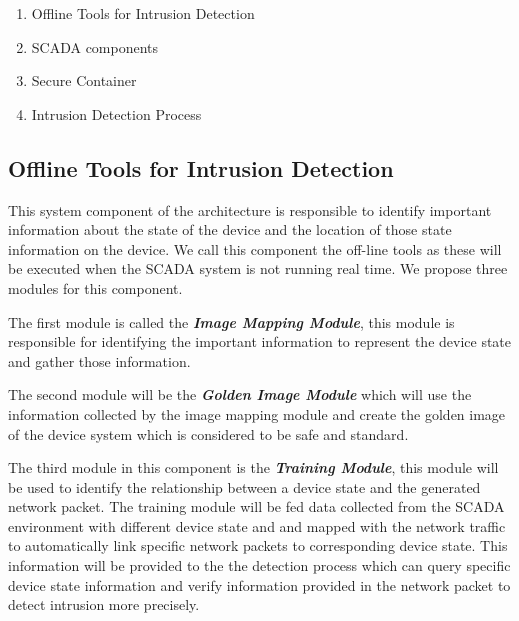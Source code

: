 \documentclass[conference]{IEEEtran}
\begin{document}
\begin{enumerate}[label=(\alph*)]
\item Offline Tools for Intrusion Detection
\item SCADA components
\item Secure Container
\item Intrusion Detection Process
\end{enumerate}
\subsection{Offline Tools for Intrusion Detection}
This system component of the architecture is responsible to identify important information about the state of the device and the location of those state information on the device. We call this component the off-line tools as these will be executed when the SCADA system is not running real time. We propose three modules for this component. 
\par The first module is called the \textit{\textbf{Image Mapping Module}}, this module is responsible for identifying the important information to represent the device state and gather those information.
\par The second module will be the \textit{\textbf{Golden Image Module}} which will use the information collected by the image mapping module and create the golden image of the device system which is considered to be safe and standard. \par The third module in this component is the \textit{\textbf{Training Module}}, this module will be used to identify the relationship between a device state and the generated network packet. The training module will be fed data collected from the SCADA environment with different device state and and mapped with the network traffic to automatically link specific network packets to corresponding device state. This information will be provided to the the detection process which can query specific device state information and verify information provided in the network packet to detect intrusion more precisely.
\end{document}
